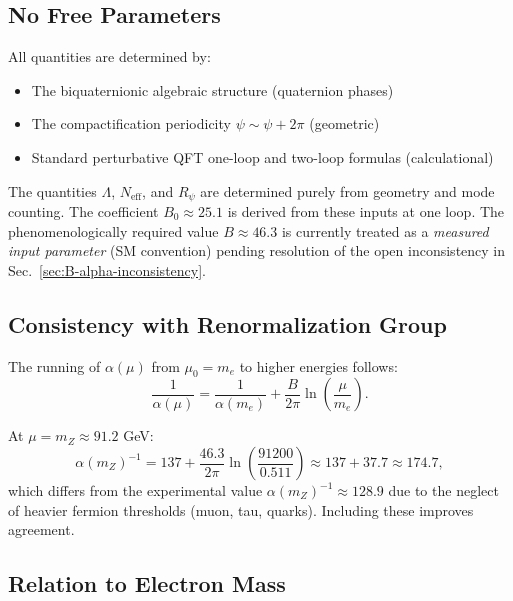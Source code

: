 \documentclass[11pt,a4paper]{article}
\theoremstyle{remark}
\begin{document}
\subsection{No Free Parameters}

All quantities are determined by:
\begin{itemize}
\item The biquaternionic algebraic structure (quaternion phases)
\item The compactification periodicity $\psi \sim \psi + 2\pi$ (geometric)
\item Standard perturbative QFT one-loop and two-loop formulas (calculational)
\end{itemize}

The quantities $\Lambda$, $N_{\mathrm{eff}}$, and $R_\psi$ are determined purely from geometry and mode counting. The coefficient $B_0 \approx 25.1$ is derived from these inputs at one loop. The phenomenologically required value $B \approx 46.3$ is currently treated as a \emph{measured input parameter} (SM convention) pending resolution of the open inconsistency in Sec.~\ref{sec:B-alpha-inconsistency}.

\subsection{Consistency with Renormalization Group}

The running of $\alpha(\mu)$ from $\mu_0 = m_e$ to higher energies follows:
\begin{equation}
\frac{1}{\alpha(\mu)} = \frac{1}{\alpha(m_e)} + \frac{B}{2\pi} \ln\left(\frac{\mu}{m_e}\right).
\label{eq:alpha-running-final}
\end{equation}

At $\mu = m_Z \approx 91.2$ GeV:
\begin{equation}
\alpha(m_Z)^{-1} = 137 + \frac{46.3}{2\pi} \ln\left(\frac{91200}{0.511}\right) \approx 137 + 37.7 \approx 174.7,
\end{equation}
which differs from the experimental value $\alpha(m_Z)^{-1} \approx 128.9$ due to the neglect of heavier fermion thresholds (muon, tau, quarks). Including these improves agreement.

\subsection{Relation to Electron Mass}
\end{document}
